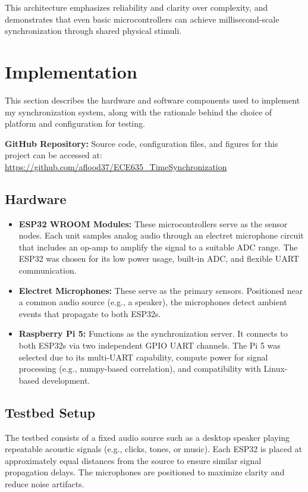\documentclass[sigconf]{acmart}
\begin{document}
This architecture emphasizes reliability and clarity over complexity, and demonstrates that even basic microcontrollers can achieve millisecond-scale synchronization through shared physical stimuli.


\section{Implementation}

This section describes the hardware and software components used to implement my synchronization system, along with the rationale behind the choice of platform and configuration for testing.

\noindent\textbf{GitHub Repository:} Source code, configuration files, and figures for this project can be accessed at: \\ \url{https://github.com/aflood37/ECE635_TimeSynchronization}


\subsection{Hardware}
\begin{itemize}
    \item \textbf{ESP32 WROOM Modules:} These microcontrollers serve as the sensor nodes. Each unit samples analog audio through an electret microphone circuit that includes an op-amp to amplify the signal to a suitable ADC range. The ESP32 was chosen for its low power usage, built-in ADC, and flexible UART communication.
    \item \textbf{Electret Microphones:} These serve as the primary sensors. Positioned near a common audio source (e.g., a speaker), the microphones detect ambient events that propagate to both ESP32s.
    \item \textbf{Raspberry Pi 5:} Functions as the synchronization server. It connects to both ESP32s via two independent GPIO UART channels. The Pi 5 was selected due to its multi-UART capability, compute power for signal processing (e.g., numpy-based correlation), and compatibility with Linux-based development.
\end{itemize}

\subsection{Testbed Setup}
The testbed consists of a fixed audio source such as a desktop speaker playing repeatable acoustic signals (e.g., clicks, tones, or music). Each ESP32 is placed at approximately equal distances from the source to ensure similar signal propagation delays. The microphones are positioned to maximize clarity and reduce noise artifacts.
\end{document}
